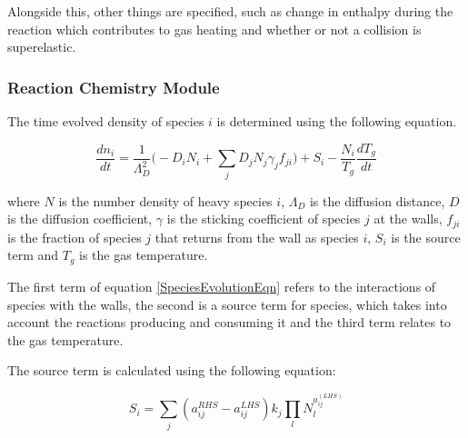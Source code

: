 \documentclass[11pt, oneside]{article}   	%
\begin{document}
Alongside this, other things are specified, such as change in enthalpy during the reaction which contributes to gas heating and whether or not a collision is superelastic.

\subsubsection*{Reaction Chemistry Module}

The time evolved density of species $i$ is determined using the following equation.

\begin{equation}
\frac{dn_i}{dt} = \frac{1}{\Lambda_D^2}\bigg(-D_iN_i + \sum_jD_jN_j\gamma_jf_{ji}\bigg) + S_i - \frac{N_i}{T_g}\frac{dT_g}{dt}
\label{SpeciesEvolutionEqn}
\end{equation}

where $N$ is the number density of heavy species $i$, $\Lambda_D$ is the diffusion distance, $D$ is the diffusion coefficient, $\gamma$ is the sticking coefficient of species $j$ at the walls, $f_{ji}$ is the fraction of species $j$ that returns from the wall as species $i$, $S_i$ is the source term and $T_g$ is the gas temperature.

The first term of equation \ref{SpeciesEvolutionEqn} refers to the interactions of species with the walls, the second is a source term for species, which takes into account the reactions producing and consuming it and the third term relates to the gas temperature.

The source term is calculated using the following equation:

\begin{equation}
S_i = \sum_j(a_{ij}^{RHS}-a_{ij}^{LHS})k_j\prod_lN_l^{a_{ij}^{(LHS)}}
\label{SourceTermEqn}
\end{equation}
\end{document}
